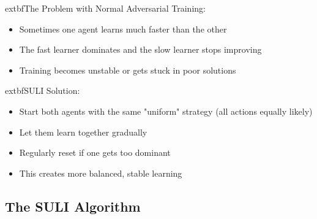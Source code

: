 \documentclass[11pt]{article}
\begin{document}
\begin{intuition}
	extbf{The Problem with Normal Adversarial Training}:
\begin{itemize}
\item Sometimes one agent learns much faster than the other
\item The fast learner dominates and the slow learner stops improving
\item Training becomes unstable or gets stuck in poor solutions
\end{itemize}

	extbf{SULI Solution}:
\begin{itemize}
\item Start both agents with the same "uniform" strategy (all actions equally likely)
\item Let them learn together gradually
\item Regularly reset if one gets too dominant
\item This creates more balanced, stable learning
\end{itemize}
\end{intuition}

\subsection{The SULI Algorithm}
\end{document}
